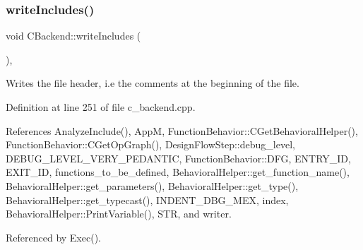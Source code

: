 \subsubsection{\texorpdfstring{write\+Includes()}{writeIncludes()}}
{\footnotesize\ttfamily void C\+Backend\+::write\+Includes (\begin{DoxyParamCaption}{ }\end{DoxyParamCaption})\hspace{0.3cm}{\ttfamily [protected]}, {\ttfamily [virtual]}}



Writes the file header, i.\+e the comments at the beginning of the file. 



Definition at line 251 of file c\+\_\+backend.\+cpp.



References Analyze\+Include(), AppM, Function\+Behavior\+::\+C\+Get\+Behavioral\+Helper(), Function\+Behavior\+::\+C\+Get\+Op\+Graph(), Design\+Flow\+Step\+::debug\+\_\+level, D\+E\+B\+U\+G\+\_\+\+L\+E\+V\+E\+L\+\_\+\+V\+E\+R\+Y\+\_\+\+P\+E\+D\+A\+N\+T\+IC, Function\+Behavior\+::\+D\+FG, E\+N\+T\+R\+Y\+\_\+\+ID, E\+X\+I\+T\+\_\+\+ID, functions\+\_\+to\+\_\+be\+\_\+defined, Behavioral\+Helper\+::get\+\_\+function\+\_\+name(), Behavioral\+Helper\+::get\+\_\+parameters(), Behavioral\+Helper\+::get\+\_\+type(), Behavioral\+Helper\+::get\+\_\+typecast(), I\+N\+D\+E\+N\+T\+\_\+\+D\+B\+G\+\_\+\+M\+EX, index, Behavioral\+Helper\+::\+Print\+Variable(), S\+TR, and writer.



Referenced by Exec().

